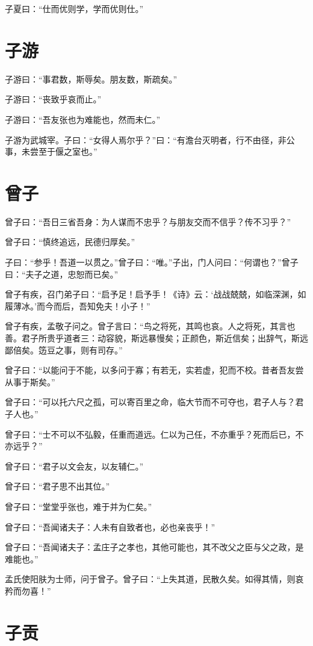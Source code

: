 \documentclass[a5paper]{ctexbook}
\begin{document}
    子夏曰：“仕而优则学，学而优则仕。”

    \chapter{子游}

    子游曰：“事君数，斯辱矣。朋友数，斯疏矣。”

    子游曰：“丧致乎哀而止。”
    
    子游曰：“吾友张也为难能也，然而未仁。”

    子游为武城宰。子曰：“女得人焉尔乎？”曰：“有澹台灭明者，行不由径，非公事，未尝至于偃之室也。”

    \chapter{曾子}

    曾子曰：“吾日三省吾身：为人谋而不忠乎？与朋友交而不信乎？传不习乎？”

    曾子曰：“慎终追远，民德归厚矣。”

    子曰：“参乎！吾道一以贯之。”曾子曰：“唯。”子出，门人问曰：“何谓也？”曾子曰：“夫子之道，忠恕而已矣。”

    曾子有疾，召门弟子曰：“启予足！启予手！《诗》云：‘战战兢兢，如临深渊，如履薄冰。’而今而后，吾知免夫！小子！”

    曾子有疾，孟敬子问之。曾子言曰：“鸟之将死，其鸣也哀。人之将死，其言也善。君子所贵乎道者三：动容貌，斯远暴慢矣；正颜色，斯近信矣；出辞气，斯远鄙倍矣。笾豆之事，则有司存。”

    曾子曰：“以能问于不能，以多问于寡；有若无，实若虚，犯而不校。昔者吾友尝从事于斯矣。”
    
    曾子曰：“可以托六尺之孤，可以寄百里之命，临大节而不可夺也，君子人与？君子人也。”
    
    曾子曰：“士不可以不弘毅，任重而道远。仁以为己任，不亦重乎？死而后已，不亦远乎？”

    曾子曰：“君子以文会友，以友辅仁。”
    
    曾子曰：“君子思不出其位。”

    曾子曰：“堂堂乎张也，难于并为仁矣。”
    
    曾子曰：“吾闻诸夫子：人未有自致者也，必也亲丧乎！”
    
    曾子曰：“吾闻诸夫子：孟庄子之孝也，其他可能也，其不改父之臣与父之政，是难能也。”

    孟氏使阳肤为士师，问于曾子。曾子曰：“上失其道，民散久矣。如得其情，则哀矜而勿喜！”

    \chapter{子贡}
\end{document}
